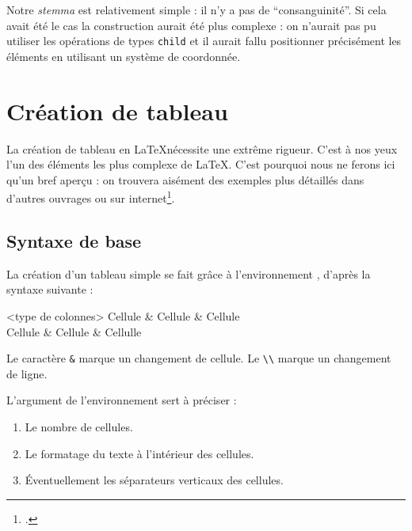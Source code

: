 Notre \emph{stemma} est relativement simple : il n'y a pas de \enquote{consanguinité}. Si cela avait été le cas la construction aurait été plus complexe : on n'aurait pas pu utiliser les opérations de types \verb|child| et il aurait fallu positionner précisément les éléments en utilisant un système de coordonnée.



\section{Création de tableau}

\begin{attention}
La création de tableau en \LaTeX nécessite  une extrême rigueur. 
C'est à nos yeux l'un des éléments les plus complexe de \LaTeX. C'est pourquoi nous ne ferons ici qu'un bref aperçu : on trouvera aisément des exemples plus détaillés dans d'autres ouvrages ou sur internet\footcite[On pourra consulter des fichiers assez didactiques :][]{bebert_tableaux}.

\end{attention}

\subsection{Syntaxe de base}

La création d'un tableau simple se fait grâce à l'environnement , d'après la syntaxe suivante :

\begin{latexcode}
\begin{tabular}{<type de colonnes>}
    Cellule & Cellule & Cellule \\
    Cellule & Cellule & Cellulle \\
\end{tabular}
\end{latexcode}

Le caractère \verb|&| marque un changement de cellule. Le \verb|\\| marque un changement de ligne.

L'argument  de l'environnement  sert à préciser :
\begin{enumerate}
    \item Le nombre de cellules.
    \item Le formatage du texte à l'intérieur des cellules.
    \item Éventuellement les séparateurs verticaux des cellules.
    
\end{enumerate}

